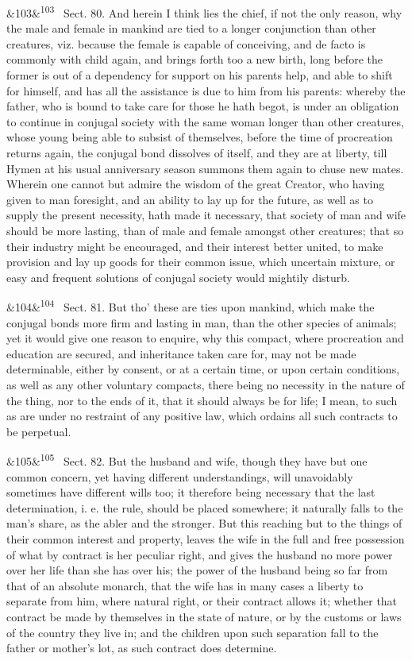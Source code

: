 \documentclass[12pt]{article}
\newcommand{\para}[1][]{\par\noindent\ifx&#1&\else\textsuperscript{\footnotesize #1}~\fi}
\begin{document}
\para[103] Sect. 80. And herein I think lies the chief, if not the only reason, why the male and female in mankind are tied to a longer conjunction than other creatures, viz. because the female is capable of conceiving, and de facto is commonly with child again, and brings forth too a new birth, long before the former is out of a dependency for support on his parents help, and able to shift for himself, and has all the assistance is due to him from his parents: whereby the father, who is bound to take care for those he hath begot, is under an obligation to continue in conjugal society with the same woman longer than other creatures, whose young being able to subsist of themselves, before the time of procreation returns again, the conjugal bond dissolves of itself, and they are at liberty, till Hymen at his usual anniversary season summons them again to chuse new mates. Wherein one cannot but admire the wisdom of the great Creator, who having given to man foresight, and an ability to lay up for the future, as well as to supply the present necessity, hath made it necessary, that society of man and wife should be more lasting, than of male and female amongst other creatures; that so their industry might be encouraged, and their interest better united, to make provision and lay up goods for their common issue, which uncertain mixture, or easy and frequent solutions of conjugal society would mightily disturb.

\para[104] Sect. 81. But tho' these are ties upon mankind, which make the conjugal bonds more firm and lasting in man, than the other species of animals; yet it would give one reason to enquire, why this compact, where procreation and education are secured, and inheritance taken care for, may not be made determinable, either by consent, or at a certain time, or upon certain conditions, as well as any other voluntary compacts, there being no necessity in the nature of the thing, nor to the ends of it, that it should always be for life; I mean, to such as are under no restraint of any positive law, which ordains all such contracts to be perpetual.

\para[105] Sect. 82. But the husband and wife, though they have but one common concern, yet having different understandings, will unavoidably sometimes have different wills too; it therefore being necessary that the last determination, i. e. the rule, should be placed somewhere; it naturally falls to the man's share, as the abler and the stronger. But this reaching but to the things of their common interest and property, leaves the wife in the full and free possession of what by contract is her peculiar right, and gives the husband no more power over her life than she has over his; the power of the husband being so far from that of an absolute monarch, that the wife has in many cases a liberty to separate from him, where natural right, or their contract allows it; whether that contract be made by themselves in the state of nature, or by the customs or laws of the country they live in; and the children upon such separation fall to the father or mother's lot, as such contract does determine.
\end{document}
